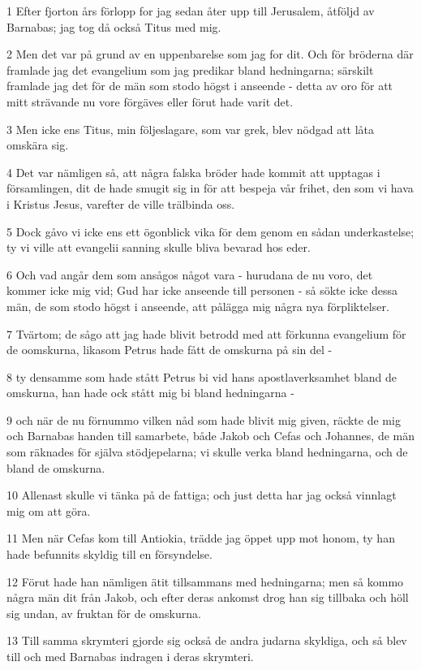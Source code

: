 \par 1 Efter fjorton års förlopp for jag sedan åter upp till Jerusalem, åtföljd av Barnabas; jag tog då också Titus med mig.
\par 2 Men det var på grund av en uppenbarelse som jag for dit. Och för bröderna där framlade jag det evangelium som jag predikar bland hedningarna; särskilt framlade jag det för de män som stodo högst i anseende - detta av oro för att mitt strävande nu vore förgäves eller förut hade varit det.
\par 3 Men icke ens Titus, min följeslagare, som var grek, blev nödgad att låta omskära sig.
\par 4 Det var nämligen så, att några falska bröder hade kommit att upptagas i församlingen, dit de hade smugit sig in för att bespeja vår frihet, den som vi hava i Kristus Jesus, varefter de ville trälbinda oss.
\par 5 Dock gåvo vi icke ens ett ögonblick vika för dem genom en sådan underkastelse; ty vi ville att evangelii sanning skulle bliva bevarad hos eder.
\par 6 Och vad angår dem som ansågos något vara - hurudana de nu voro, det kommer icke mig vid; Gud har icke anseende till personen - så sökte icke dessa män, de som stodo högst i anseende, att pålägga mig några nya förpliktelser.
\par 7 Tvärtom; de sågo att jag hade blivit betrodd med att förkunna evangelium för de oomskurna, likasom Petrus hade fått de omskurna på sin del -
\par 8 ty densamme som hade stått Petrus bi vid hans apostlaverksamhet bland de omskurna, han hade ock stått mig bi bland hedningarna -
\par 9 och när de nu förnummo vilken nåd som hade blivit mig given, räckte de mig och Barnabas handen till samarbete, både Jakob och Cefas och Johannes, de män som räknades för själva stödjepelarna; vi skulle verka bland hedningarna, och de bland de omskurna.
\par 10 Allenast skulle vi tänka på de fattiga; och just detta har jag också vinnlagt mig om att göra.
\par 11 Men när Cefas kom till Antiokia, trädde jag öppet upp mot honom, ty han hade befunnits skyldig till en försyndelse.
\par 12 Förut hade han nämligen ätit tillsammans med hedningarna; men så kommo några män dit från Jakob, och efter deras ankomst drog han sig tillbaka och höll sig undan, av fruktan för de omskurna.
\par 13 Till samma skrymteri gjorde sig också de andra judarna skyldiga, och så blev till och med Barnabas indragen i deras skrymteri.
